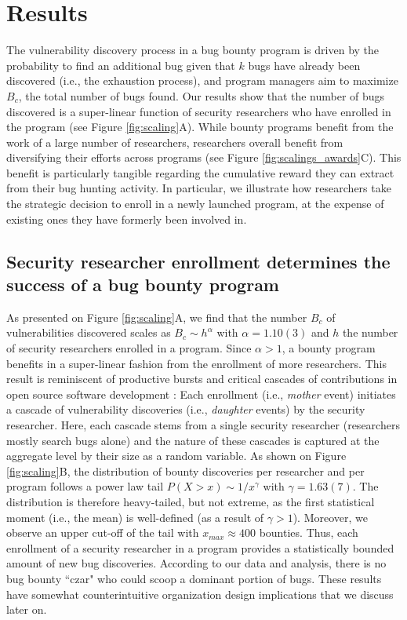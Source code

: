 \section{Results}
\label{sec:results}
The vulnerability discovery process in a bug bounty program is driven by the probability to find an additional bug given that $k$ bugs have already been discovered (i.e., the exhaustion process), and program managers aim to maximize $B_c$, the total number of bugs found. Our results show that the number of bugs discovered is a super-linear function of security researchers who have enrolled in the program (see Figure \ref{fig:scaling}A). While bounty programs benefit from the work of a large number of researchers, researchers overall benefit from diversifying their efforts across programs (see Figure \ref{fig:scalings_awards}C). This benefit is particularly tangible regarding the cumulative reward they can extract from their bug hunting activity. In particular, we illustrate how researchers take the strategic decision to enroll in a newly launched program, at the expense of existing ones they have formerly been involved in.
 
\subsection{Security researcher enrollment determines the success of a bug bounty program}
\label{sec:enrollment}

As presented on Figure \ref{fig:scaling}A, we find that the number $B_c$ of vulnerabilities discovered scales as $B_c \sim h^{\alpha}$ with $\alpha = 1.10(3)$ and $h$ the number of security researchers enrolled in a program. Since $\alpha > 1$, a bounty program benefits in a super-linear fashion from the enrollment of more researchers. This result is reminiscent of productive bursts and critical cascades of contributions in open source software development \cite{sornette2014much}: Each enrollment (i.e., {\it mother} event) initiates a cascade of vulnerability discoveries (i.e., {\it daughter} events) by the security researcher. Here, each cascade stems from a single security researcher (researchers mostly search bugs alone) and the nature of these cascades is captured at the aggregate level by their size as a random variable. As shown on Figure \ref{fig:scaling}B, the distribution of bounty discoveries per researcher and per program follows a power law tail $P(X>x) \sim 1/x^\gamma$  with $ \gamma = 1.63(7)$. The distribution is therefore heavy-tailed, but not extreme, as the first statistical moment (i.e., the mean) is well-defined (as a result of $ \gamma > 1$). Moreover, we observe an upper cut-off of the tail with $x_{max} \approx 400$ bounties. Thus, each enrollment of a security researcher in a program provides a statistically bounded amount of new bug discoveries. According to our data and analysis, there is no bug bounty ``czar" who could scoop a dominant portion of bugs. These results have somewhat counterintuitive organization design implications that we discuss later on.\\

